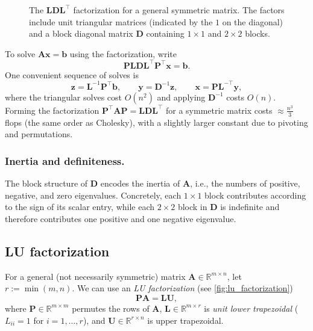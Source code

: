 \begin{figure}[htbp]
\caption{The $\mathbf{LDL}^\top$ factorization for a general symmetric matrix. 
The factors include unit triangular matrices (indicated by the $1$ on the diagonal) 
and a block diagonal matrix $\mathbf{D}$ containing $1\times 1$ and $2\times 2$ blocks.}
\label{fig:ldl_factorization}
\end{figure}

To solve $\mathbf{A}\mathbf{x}=\mathbf{b}$ using the factorization, write
\[
  \mathbf{P}\mathbf{L}\mathbf{D}\mathbf{L}^\top \mathbf{P}^\top \mathbf{x}=\mathbf{b}.
\]
One convenient sequence of solves is
\[
  \mathbf{z}=\mathbf{L}^{-1}\mathbf{P}^\top\mathbf{b},\qquad
  \mathbf{y}=\mathbf{D}^{-1}\mathbf{z},\qquad
  \mathbf{x}=\mathbf{P}\mathbf{L}^{-\top}\mathbf{y},
\]
where the triangular solves cost $O(n^2)$ and applying $\mathbf{D}^{-1}$ costs
$O(n)$. Forming the factorization
$\mathbf{P}^{\top}\mathbf{A}\mathbf{P}=\mathbf{L}\mathbf{D}\mathbf{L}^{\top}$
for a symmetric matrix costs
$\approx \frac{n^3}{3}$ flops (the same order as Cholesky), with a slightly larger constant due to
pivoting and permutations.
\subsubsection{Inertia and definiteness.}
The block structure of $\mathbf{D}$ encodes the inertia of $\mathbf{A}$, i.e.,
the numbers of positive, negative, and zero eigenvalues.
Concretely, each $1\times 1$ block contributes according to the sign of its
scalar entry, while each $2\times 2$ block in $\mathbf{D}$ is indefinite and
therefore contributes one positive and one negative eigenvalue. 


\subsection{LU factorization}
\label{sec:ch3-lu}
For a general (not necessarily symmetric) matrix
$\mathbf{A}\in\mathbb{R}^{m\times n}$, let $r:=\min(m,n)$. We can use an \emph{LU factorization}
(see \cref{fig:lu_factorization})
\[
  \mathbf{P}\mathbf{A}=\mathbf{L}\mathbf{U},
\]
where $\mathbf{P}\in\mathbb{R}^{m\times m}$ permutes the rows of $\mathbf{A}$,
$\mathbf{L}\in\mathbb{R}^{m\times r}$ is \emph{unit lower trapezoidal}
($L_{ii}=1$ for $i=1,\dots,r$), and $\mathbf{U}\in\mathbb{R}^{r\times n}$ is
upper trapezoidal. 

